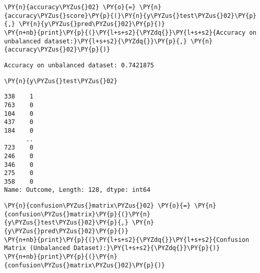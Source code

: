     \begin{tcolorbox}[breakable, size=fbox, boxrule=1pt, pad at break*=1mm,colback=cellbackground, colframe=cellborder]
\begin{Verbatim}[commandchars=\\\{\}]
\PY{n}{accuracy\PYZus{}02} \PY{o}{=} \PY{n}{accuracy\PYZus{}score}\PY{p}{(}\PY{n}{y\PYZus{}test\PYZus{}02}\PY{p}{,} \PY{n}{y\PYZus{}pred\PYZus{}02}\PY{p}{)}
\PY{n+nb}{print}\PY{p}{(}\PY{l+s+s2}{\PYZdq{}}\PY{l+s+s2}{Accuracy on unbalanced dataset:}\PY{l+s+s2}{\PYZdq{}}\PY{p}{,} \PY{n}{accuracy\PYZus{}02}\PY{p}{)}
\end{Verbatim}
\end{tcolorbox}

    \begin{Verbatim}[commandchars=\\\{\}]
Accuracy on unbalanced dataset: 0.7421875
    \end{Verbatim}

    \begin{tcolorbox}[breakable, size=fbox, boxrule=1pt, pad at break*=1mm,colback=cellbackground, colframe=cellborder]
\begin{Verbatim}[commandchars=\\\{\}]
\PY{n}{y\PYZus{}test\PYZus{}02}
\end{Verbatim}
\end{tcolorbox}

            \begin{tcolorbox}[breakable, size=fbox, boxrule=.5pt, pad at break*=1mm, opacityfill=0]
\begin{Verbatim}[commandchars=\\\{\}]
338    1
763    0
104    0
437    0
184    0
      ..
723    0
246    0
346    0
275    0
358    0
Name: Outcome, Length: 128, dtype: int64
\end{Verbatim}
\end{tcolorbox}
        
    \begin{tcolorbox}[breakable, size=fbox, boxrule=1pt, pad at break*=1mm,colback=cellbackground, colframe=cellborder]
\begin{Verbatim}[commandchars=\\\{\}]
\PY{n}{confusion\PYZus{}matrix\PYZus{}02} \PY{o}{=} \PY{n}{confusion\PYZus{}matrix}\PY{p}{(}\PY{n}{y\PYZus{}test\PYZus{}02}\PY{p}{,} \PY{n}{y\PYZus{}pred\PYZus{}02}\PY{p}{)}
\PY{n+nb}{print}\PY{p}{(}\PY{l+s+s2}{\PYZdq{}}\PY{l+s+s2}{Confusion Matrix (Unbalanced Dataset):}\PY{l+s+s2}{\PYZdq{}}\PY{p}{)}
\PY{n+nb}{print}\PY{p}{(}\PY{n}{confusion\PYZus{}matrix\PYZus{}02}\PY{p}{)}
\end{Verbatim}
\end{tcolorbox}

